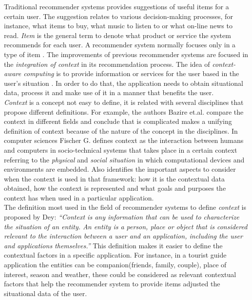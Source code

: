 Traditional recommender systems provides suggestions of useful items
for a certain user. The suggestion relates to various decision-making
processes, for instance, what items to buy, what music to listen to or
what on-line news to read. \textit{Item} is the general term to denote
what product or service the system recommends for each user. A
recommender system normally focuses only in a type of item
\cite{resnick1997recommender}.
The improvements of previous recommender systems are focused in the
\textit{integration of context} in its recommendation process. 
The idea of \textit{context-aware computing} is to provide
information or services for the user based in the user's situation
\cite{dey2001understanding}. In order to do that, the application 
needs to obtain situational data, process it and make use of it 
in a manner that benefits the user. \\ 
\textit{Context} is a concept not easy to define, it is related with
several disciplines that propose different definitions. For example,
the authors Bazire et.al.\cite{bazire2005understanding} compare the
context in different fields and conclude that is complicated makes a
unifying definition of context because of the nature of the concept in
the disciplines. In computer sciences Fischer
G.\cite{fischer2012context} defines context as the interaction between
humans and computers in socio-technical systems that takes place in a
certain context referring to the \textit{physical} and \textit{social
situation} in which  computational devices and environments are
embedded. Also identifies the important aspects to consider when the
context is used in that framework: how it is the contextual data
obtained, how the context is represented and what goals and purposes
the context has when used in a particular application. \\
The definition most used in the field of recommender systems to
define \textit{context} is proposed by Dey\cite{dey2001understanding}:
\textit{``Context is any information that can be used to characterize
the situation of an entity. An entity is a person, place or object
that is considered relevant to the interaction between a user and  an
application, including the user and applications themselves.''}  This
definition makes it easier to define the contextual factors in a
specific application. For instance, in a
tourist guide application the entities can be companion(friends,
family, couple), place of interest, season and weather, these could be
considered as relevant contextual factors that help the recommender
system to provide items adjusted the situational data of the user.\\
